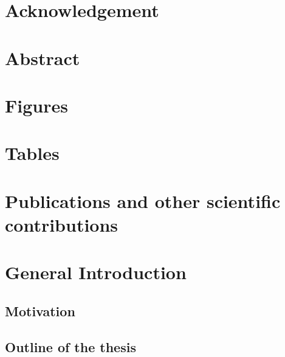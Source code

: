 \documentclass[12pt]{report}
\begin{document}


\tableofcontents

\chapter*{Acknowledgement}


\chapter*{Abstract}
\setcounter{page}{3}


\chapter*{Figures}

\chapter*{Tables}

\printglossary[title={List of Abbreviations}]

\chapter*{Publications and other scientific contributions}


\chapter{General Introduction}\label{chap:intro}

    \section{Motivation}
    
    \label{sec:motivation}
    
    \section{Outline of the thesis}
    \label{sec:outline}
    
\end{document}
